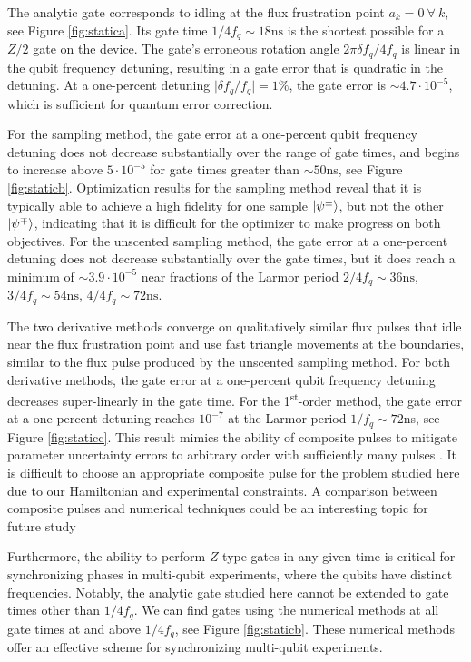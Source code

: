 The analytic gate corresponds to
idling at the flux frustration point $a_{k} = 0 \ \forall \ k$, see Figure
\ref{fig:statica}. Its gate time $1 / 4 f_{q} \sim 18\textrm{ns}$
is the shortest possible for a $Z/2$ gate on the device.
The gate's erroneous rotation angle
$2 \pi \delta f_{q} / 4 f_{q}$ is linear in the
qubit frequency detuning, resulting in a gate error that is quadratic
in the detuning.
At a one-percent detuning $\lvert \delta f_{q} / f_{q} \rvert = 1\%$,
the gate error is $\sim 4.7 \cdot 10^{-5}$,
which is sufficient for quantum error correction.

For the sampling method, the gate error at a one-percent qubit frequency detuning
does not decrease substantially over the
range of gate times, and begins to increase above $5 \cdot 10^{-5}$ for gate times
greater than $\sim 50$ns, see Figure \ref{fig:staticb}.
Optimization results for the sampling method reveal that it is typically
able to achieve a high fidelity for
one sample $\ket{\psi^{\pm}}$,
but not the other $\ket{\psi^{\mp}}$, indicating that it is difficult for the optimizer
to make progress on both objectives.
For the unscented sampling method,
the gate error at a one-percent detuning
does not decrease substantially 
over the gate times, but it does reach
a minimum of $\sim 3.9 \cdot 10^{-5}$
near fractions of the Larmor period $2/4f_{q} \sim 36\textrm{ns}$,
$3/4f_{q} \sim 54\textrm{ns}$, $4/4f_{q} \sim 72\textrm{ns}$.

The two derivative methods converge on qualitatively similar flux pulses that
idle near the flux frustration point and use fast triangle movements at the boundaries,
similar to the flux pulse produced by the unscented sampling method.
For both derivative methods, the gate error at a one-percent qubit frequency detuning
decreases super-linearly in the gate time.
For the 1\textsuperscript{st}-order method, the gate error at a one-percent detuning 
reaches $10^{-7}$ at the Larmor period $1 / f_{q} \sim 72$ns,
see Figure \ref{fig:staticc}.
This result mimics the
ability of composite pulses to mitigate parameter uncertainty errors to arbitrary
order with sufficiently many pulses \cite{merrill2014progress}.
It is difficult to choose an appropriate composite pulse
for the problem studied here due to our Hamiltonian and experimental constraints.
A comparison between composite pulses and numerical techniques could be an
interesting topic for future study

Furthermore, the ability to perform
$Z$-type gates in any given time is critical
for synchronizing phases in multi-qubit experiments,
where the qubits have distinct
frequencies. Notably, the analytic gate studied here cannot be extended
to gate times other than $1 / 4 f_{q}$. 
We can find gates using the numerical methods at
all gate times at and above $1 / 4 f_{q}$, see Figure \ref{fig:staticb}.
These numerical methods offer an effective scheme for synchronizing
multi-qubit experiments.
